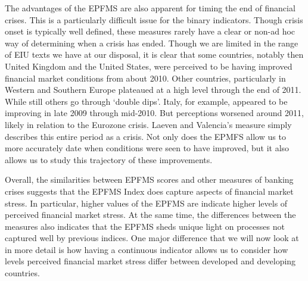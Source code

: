\documentclass[]{article}
\begin{document}
The advantages of the EPFMS are also apparent for timing the end of financial crises. This is a particularly difficult issue for the binary indicators. Though crisis onset is typically well defined, these measures rarely have a clear or non-ad hoc way of determining when a crisis has ended. Though we are limited in the range of EIU texts we have at our disposal, it is clear that some countries, notably then United Kingdom and the United States, were perceived to be having improved financial market conditions from about 2010. Other countries, particularly in Western and Southern Europe plateaued at a high level through the end of 2011. While still others go through `double dips'. Italy, for example, appeared to be improving in late 2009 through mid-2010. But perceptions worsened around 2011, likely in relation to the Eurozone crisis. Laeven and Valencia's measure simply describes this entire period as a crisis. Not only does the EPMFS allow us to more accurately date when conditions were seen to have improved, but it also allows us to study this trajectory of these improvements.

Overall, the similarities between EPFMS scores and other measures of
banking crises suggests that the EPFMS Index does capture aspects of
financial market stress. In particular, higher values of the EPFMS are
indicate higher levels of perceived financial market stress. At the same
time, the differences between the measures also indicates that the EPFMS
sheds unique light on processes not captured well by previous indices.
One major difference that we will now look at in more detail is how
having a continuous indicator allows us to consider how levels perceived
financial market stress differ between developed and developing
countries.
\end{document}
